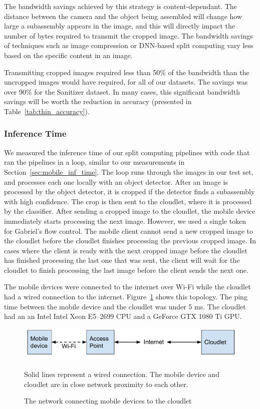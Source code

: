 The bandwidth savings achieved by this strategy is content-dependant.
The distance between the camera and the object being assembled will change how
large a subassembly appears in the image, and this will directly impact the
number of bytes required to transmit the cropped image.
The bandwidth savings of techniques such as image compression or DNN-based split
computing vary less based on the specific content in an image.

Transmitting cropped images required less than 50\% of the bandwidth than
the uncropped images would have required, for all of our datasets.
The savings was over 90\% for the Sanitizer dataset.
In many cases, this significant bandwidth savings will be worth the reduction in
accuracy (presented in Table~\ref{tab:thin_accuracy}).

\subsubsection{Inference Time}

We measured the inference time of our split computing pipelines with code that
ran the pipelines in a loop, similar to our measurements in
Section~\ref{sec:mobile_inf_time}.
The loop runs through the images in our test set, and processes each one locally
with an object detector.
After an image is processed by the object detector, it is cropped if the
detector finds a subassembly with high confidence.
The crop is then sent to the cloudlet, where it is processed by the classifier.
After sending a cropped image to the cloudlet, the mobile device immediately
starts processing the next image.
However, we used a single token for Gabriel's flow control.
The mobile client cannot send a new cropped image to the cloudlet before the
cloudlet finishes processing the previous cropped image.
In cases where the client is ready with the next cropped image before the
cloudlet has finished processing the last one that was sent, the client will
wait for the cloudlet to finish processing the last image before the client
sends the next one.

The mobile devices were connected to the internet over Wi-Fi while the cloudlet
had a wired connection to the internet.
Figure~{\ref{fig:devices}} shows this topology.
The ping time between the mobile device and the cloudlet was under 5 ms.
The cloudlet had an an Intel Intel Xeon E5–2699 CPU and a GeForce GTX 1080 Ti
GPU.

\begin{figure}
  \includegraphics[width=\textwidth]{figures/devices.pdf}
  \begin{captiontext}
    Solid lines represent a wired connection.
    The mobile device and cloudlet are in close network proximity to each other.
  \end{captiontext}
  \caption{
    The network connecting mobile devices to the cloudlet
  }\label{fig:devices}
\end{figure}

